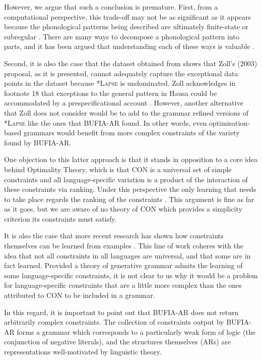 However, we argue that such a conclusion is premature. First, from a computational 
perspective, this trade-off may not be as significant as it appears because the 
phonological patterns being described are ultimately finite-state 
\citep{karttunen1998proper} or subregular \citep{Heinz-2011-CPF, Heinz-2011-CPGLF}. 
There are many ways to decompose a phonological pattern into parts, and it has been 
argued that understanding each of these ways is valuable \citep{Lambert-2025}.

Second, it is also the case that the dataset obtained from
\citet{wold-4} shows that Zoll's (2003) proposal, as it is presented,
cannot adequately capture the exceptional data points in the dataset
because *\textsc{Lapse} is undominated. Zoll acknowledges in footnote
18 that exceptions to the general pattern in Hausa could be
accommodated by a prespecificational account
\citep{inkelas1993inalterability}. However, another alternative that
Zoll does not consider would be to add to the grammar refined versions
of *\textsc{Lapse} like the ones that BUFIA-AR found.  In other words,
even optimisation-based grammars would benefit from more complex
constraints of the variety found by BUFIA-AR.

One objection to this latter approach is that it stands in opposition
to a core idea behind Optimality Theory, which is that CON is a
universal set of simple constraints and all language-specific
variation is a product of the interaction of these constraints via
ranking. Under this perspective the only learning that needs to take
place regards the ranking of the constraints
\citep{TesarSmolensky1998, TesarSmolensky2000}. This argument is fine
as far as it goes, but we are aware of no theory of CON which provides
a simplicity criterion its constraints must satisfy.

It is also the case that more recent research has shown how
constraints themselves can be learned from examples
\citep{hayes2008maximum, Heinz2009, Heinz2010, Lambert+2021-TESRL}.
This line of work coheres with the idea that not all constraints in
all languages are universal, and that some are in fact
learned. Provided a theory of generative grammar admits the learning
of some language-specific constraints, it is not clear to us why it
would be a problem for language-specific constraints that are a little
more complex than the ones attributed to CON to be included in a
grammar.

In this regard, it is important to point out that BUFIA-AR
does not return arbitrarily complex constraints. 
The collection of constraints output by BUFIA-AR forms a grammar which
corresponds to a particularly weak form of logic (the conjunction of
negative literals), and the structures themselves (ARs) are representations well-motivated by linguistic theory.

